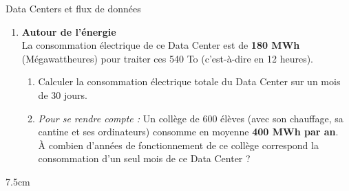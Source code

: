 \documentclass[a4paper]{book}
\begin{document}
{\begin{exerciceTitre}{Data Centers et flux de données}
\begin{enumerate}
            \item \textbf{Autour de l'énergie} \\
            La consommation électrique de ce Data Center est de \textbf{180 MWh} (Mégawattheures) pour traiter ces 540 To (c'est-à-dire en 12 heures).
            \begin{enumerate}
                \item Calculer la consommation électrique totale du Data Center sur un mois de 30 jours.
                \item \textit{Pour se rendre compte :} Un collège de 600 élèves (avec son chauffage, sa cantine et ses ordinateurs) consomme en moyenne \textbf{400 MWh par an}. \\
                À combien d'années de fonctionnement de ce collège correspond la consommation d'un seul mois de ce Data Center ?
            \end{enumerate}
        \end{enumerate}
        
        \begin{ZoneReponse}{7.5cm}
        \end{ZoneReponse}
    \end{exerciceTitre}

}
\end{document}
